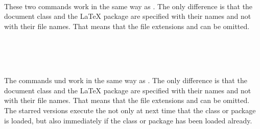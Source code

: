 \begin{Declaration}
  \\
\end{Declaration}%
%
%
These two commands work in the same way as .  The
only difference is that the document class  and the
{\LaTeX} package  are specified with their names and
not with their file names.  That means that the file extensions
 and  can be omitted.
%
%
%

\begin{Declaration}
  \\
  \\
  \\
\end{Declaration}%
%
%
%
%
The commands  und  work in the
same way as .  The only difference is that the
document class  and the {\LaTeX} package 
are specified with their names and not with their file names.  That
means that the file extensions  and  can be
omitted.  The starred versions execute the  not
only at next time that the class or package is loaded, but also
immediately if the class or package has been loaded already.
%
%
%
%
%


